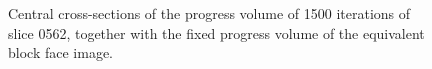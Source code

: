 \begin{figure}[htbp]
    \caption{Central cross-sections of the progress volume of 1500 iterations of slice 0562, together with the fixed progress volume of the equivalent block face image.}
    \label{fig:progress_cross_sections}
  \end{figure}
      
